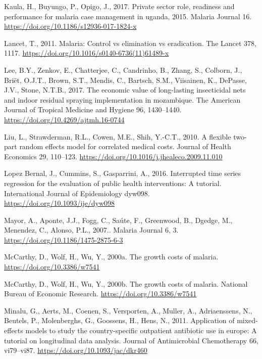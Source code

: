 \documentclass[]{article}
\begin{document}
\hypertarget{ref-Kaula_2017}{}
Kaula, H., Buyungo, P., Opigo, J., 2017. Private sector role, readiness
and performance for malaria case management in uganda, 2015. Malaria
Journal 16. \url{https://doi.org/10.1186/s12936-017-1824-x}

\hypertarget{ref-TheLancet2011}{}
Lancet, T., 2011. Malaria: Control vs elimination vs eradication. The
Lancet 378, 1117. \url{https://doi.org/10.1016/s0140-6736(11)61489-x}

\hypertarget{ref-Lee2017}{}
Lee, B.Y., Zenkov, E., Chatterjee, C., Candrinho, B., Zhang, S.,
Colborn, J., Briët, O.J.T., Brown, S.T., Mendis, C., Bartsch, S.M.,
Viisainen, K., DePasse, J.V., Stone, N.T.B., 2017. The economic value of
long-lasting insecticidal nets and indoor residual spraying
implementation in mozambique. The American Journal of Tropical Medicine
and Hygiene 96, 1430--1440. \url{https://doi.org/10.4269/ajtmh.16-0744}

\hypertarget{ref-Liu2010}{}
Liu, L., Strawderman, R.L., Cowen, M.E., Shih, Y.-C.T., 2010. A flexible
two-part random effects model for correlated medical costs. Journal of
Health Economics 29, 110--123.
\url{https://doi.org/10.1016/j.jhealeco.2009.11.010}

\hypertarget{ref-Lopez_Bernal_2016}{}
Lopez Bernal, J., Cummins, S., Gasparrini, A., 2016. Interrupted time
series regression for the evaluation of public health interventions: A
tutorial. International Journal of Epidemiology dyw098.
\url{https://doi.org/10.1093/ije/dyw098}

\hypertarget{ref-Mayor2007}{}
Mayor, A., Aponte, J.J., Fogg, C., Saúte, F., Greenwood, B., Dgedge, M.,
Menendez, C., Alonso, P.L., 2007.. Malaria Journal 6, 3.
\url{https://doi.org/10.1186/1475-2875-6-3}

\hypertarget{ref-McCarthy_2000}{}
McCarthy, D., Wolf, H., Wu, Y., 2000a. The growth costs of malaria.
\url{https://doi.org/10.3386/w7541}

\hypertarget{ref-McCarthy2000}{}
McCarthy, D., Wolf, H., Wu, Y., 2000b. The growth costs of malaria.
National Bureau of Economic Research.
\url{https://doi.org/10.3386/w7541}

\hypertarget{ref-Minalu2011}{}
Minalu, G., Aerts, M., Coenen, S., Versporten, A., Muller, A.,
Adriaenssens, N., Beutels, P., Molenberghs, G., Goossens, H., Hens, N.,
2011. Application of mixed-effects models to study the country-specific
outpatient antibiotic use in europe: A tutorial on longitudinal data
analysis. Journal of Antimicrobial Chemotherapy 66, vi79--vi87.
\url{https://doi.org/10.1093/jac/dkr460}
\end{document}
